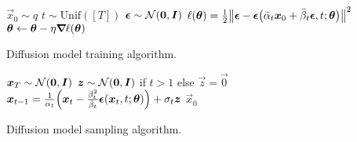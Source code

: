 \begin{algorithm}[t]
    \begin{algorithmic}[1]
        \State $\vec{x}_0 \sim q$
        \State $t \sim \mathrm{Unif}([T])$
        \State $\bm{\epsilon} \sim \mathcal{N}(\bm{0}, \bm{I})$
        \State $\ell(\vec{\theta}) = \frac{1}{2} \lft\| \vec{\epsilon} - \vec{\epsilon}\lft( \bar{\alpha}_t \vec{x}_0 + \bar{\beta}_t \vec{\epsilon}, t; \vec{\theta} \rgt) \rgt\|^2$
        \State $\bm{\theta} \gets \bm{\theta} - \eta \bm{\nabla}_{\! } \ell(\bm{\theta})$
        \EndWhile
    \end{algorithmic}
    \label{alg:dm-training}
    \caption{Diffusion model training algorithm.}
\end{algorithm}

\begin{algorithm}[t]
    \begin{algorithmic}[1]
        \State $\bm{x}_T \sim \mathcal{N}(\bm{0}, \bm{I})$
        \State $\bm{z} \sim \mathcal{N}(\bm{0}, \bm{I})$ if $t > 1$ else $\vec{z} = \vec{0}$
        \State $\vec{x}_{t-1} = \frac{1}{\alpha_t} \lft( \vec{x}_t - \frac{\beta_t^2}{\bar{\beta}_t} \vec{\epsilon}(\vec{x}_t, t; \vec{\theta}) \rgt) + \sigma_t \vec{z}$
        \EndFor
        \State \Return $\vec{x}_0$
    \end{algorithmic}
    \label{alg:dm-sampling}
    \caption{Diffusion model sampling algorithm.}
\end{algorithm}
